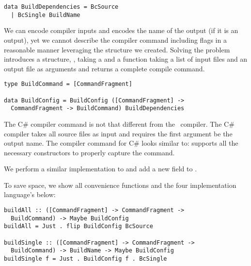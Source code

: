 {{{{{\begin{tcolorbox}
\begin{verbatim}
data BuildDependencies = BcSource
  | BcSingle BuildName
\end{verbatim}
\end{tcolorbox}

We can encode compiler inputs and  encodes the name of the output (if it is an output), yet we cannot describe the compiler command including flags in a reasonable manner leveraging the  structure we created. Solving the problem introduces a structure, , taking a  and a function taking a list of input files and an output file as arguments and returns a complete compile command.

\begin{tcolorbox}
\begin{verbatim}
type BuildCommand = [CommandFragment]

data BuildConfig = BuildConfig ([CommandFragment] ->
  CommandFragment -> BuildCommand) BuildDependencies
\end{verbatim}
\end{tcolorbox}

The C\# compiler command is not that different from the \CC~compiler. The C\# compiler takes all source files as input and requires the first argument be the output name. The compiler command for C\# looks similar to:  \linebreak{} supports all the necessary constructors to properly capture the command.

We perform a similar implementation to  and add a new field  to .

To save space, we show all convenience functions and the four implementation language's  below:

\begin{tcolorbox}[breakable, toprule at break=0pt, bottomrule at break=0pt]
\begin{verbatim}
buildAll :: ([CommandFragment] -> CommandFragment ->
  BuildCommand) -> Maybe BuildConfig
buildAll = Just . flip BuildConfig BcSource

buildSingle :: ([CommandFragment] -> CommandFragment ->
  BuildCommand) -> BuildName -> Maybe BuildConfig
buildSingle f = Just . BuildConfig f . BcSingle


\end{verbatim}
\end{tcolorbox}}}}}}
